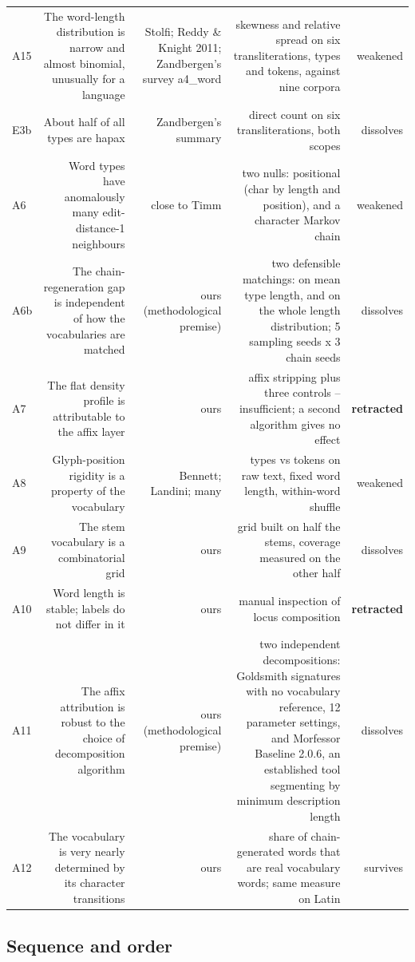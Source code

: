 \documentclass[11pt,a4paper]{article}
\begin{document}
\begin{table}[htbp]
\begin{tabular}{@{}lrrrr@{}}
A15 & The word-length distribution is narrow and almost binomial, unusually for a language & Stolfi; Reddy \& Knight 2011; Zandbergen's survey a4\_word & skewness and relative spread on six transliterations, types and tokens, against nine corpora & weakened \\
E3b & About half of all types are hapax & Zandbergen's summary & direct count on six transliterations, both scopes & dissolves \\
A6 & Word types have anomalously many edit-distance-1 neighbours & close to Timm & two nulls: positional (char by length and position), and a character Markov chain & weakened \\
A6b & The chain-regeneration gap is independent of how the vocabularies are matched & ours (methodological premise) & two defensible matchings: on mean type length, and on the whole length distribution; 5 sampling seeds x 3 chain seeds & dissolves \\
A7 & The flat density profile is attributable to the affix layer & ours & affix stripping plus three controls -- insufficient; a second algorithm gives no effect & \textbf{retracted} \\
A8 & Glyph-position rigidity is a property of the vocabulary & Bennett; Landini; many & types vs tokens on raw text, fixed word length, within-word shuffle & weakened \\
A9 & The stem vocabulary is a combinatorial grid & ours & grid built on half the stems, coverage measured on the other half & dissolves \\
A10 & Word length is stable; labels do not differ in it & ours & manual inspection of locus composition & \textbf{retracted} \\
A11 & The affix attribution is robust to the choice of decomposition algorithm & ours (methodological premise) & two independent decompositions: Goldsmith signatures with no vocabulary reference, 12 parameter settings, and Morfessor Baseline 2.0.6, an established tool segmenting by minimum description length & dissolves \\
A12 & The vocabulary is very nearly determined by its character transitions & ours & share of chain-generated words that are real vocabulary words; same measure on Latin & survives \\
\bottomrule
\end{tabular}
\end{table}

\subsection*{Sequence and order}
\end{document}
